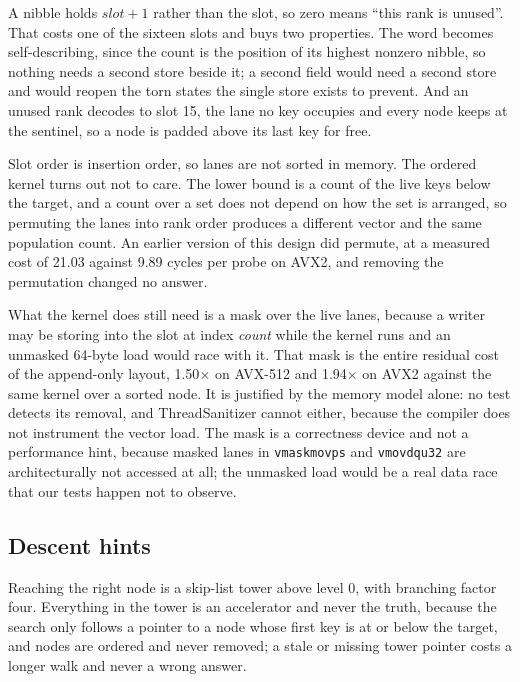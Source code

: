 \documentclass[conference]{IEEEtran}
\begin{document}
A nibble holds $\mathit{slot}+1$ rather than the slot, so zero means ``this rank is
unused''. That costs one of the sixteen slots and buys two properties. The word
becomes self-describing, since the count is the position of its highest nonzero
nibble, so nothing needs a second store beside it; a second field would need a
second store and would reopen the torn states the single store exists to prevent.
And an unused rank decodes to slot 15, the lane no key occupies and every node
keeps at the sentinel, so a node is padded above its last key for free.

Slot order is insertion order, so lanes are not sorted in memory. The ordered
kernel turns out not to care. The lower bound is a count of the live keys below
the target, and a count over a set does not depend on how the set is arranged, so
permuting the lanes into rank order produces a different vector and the same
population count. An earlier version of this design did permute, at a measured
cost of 21.03 against 9.89 cycles per probe on AVX2, and removing the permutation
changed no answer.

What the kernel does still need is a mask over the live lanes, because a writer
may be storing into the slot at index \emph{count} while the kernel runs and an
unmasked 64-byte load would race with it. That mask is the entire residual cost of
the append-only layout, 1.50$\times$ on AVX-512 and 1.94$\times$ on AVX2 against
the same kernel over a sorted node. It is justified by the memory model \cite{boehm2008memorymodel} alone: no test
detects its removal, and ThreadSanitizer cannot either, because the compiler does
not instrument the vector load. The mask is a correctness device and not a
performance hint, because masked lanes in \texttt{vmaskmovps} and
\texttt{vmovdqu32} are architecturally not accessed at all; the unmasked load
would be a real data race that our tests happen not to observe.

\subsection{Descent hints}

Reaching the right node is a skip-list tower above level 0, with branching factor
four. Everything in the tower is an accelerator and never the truth, because the
search only follows a pointer to a node whose first key is at or below the target,
and nodes are ordered and never removed; a stale or missing tower pointer costs a
longer walk and never a wrong answer.
\end{document}
